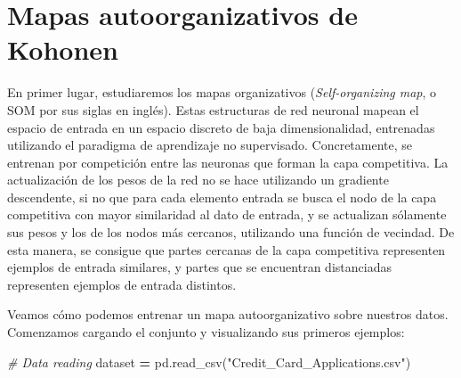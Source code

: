 \documentclass[
  a4paper,
,tablecaptionabove
]{scrartcl}
\newenvironment{Shaded}{\begin{snugshade}}{\end{snugshade}}
\newcommand{\CommentTok}[1]{\textcolor[rgb]{0.56,0.35,0.01}{\textit{#1}}}
\newcommand{\NormalTok}[1]{#1}
\newcommand{\OperatorTok}[1]{\textcolor[rgb]{0.81,0.36,0.00}{\textbf{#1}}}
\newcommand{\StringTok}[1]{\textcolor[rgb]{0.31,0.60,0.02}{#1}}
\begin{document}
\hypertarget{mapas-autoorganizativos-de-kohonen}{%
\section{Mapas autoorganizativos de
Kohonen}\label{mapas-autoorganizativos-de-kohonen}}

En primer lugar, estudiaremos los mapas organizativos
(\emph{Self-organizing map}, o SOM por sus siglas en inglés). Estas
estructuras de red neuronal mapean el espacio de entrada en un espacio
discreto de baja dimensionalidad, entrenadas utilizando el paradigma de
aprendizaje no supervisado. Concretamente, se entrenan por competición
entre las neuronas que forman la capa competitiva. La actualización de
los pesos de la red no se hace utilizando un gradiente descendente, si
no que para cada elemento entrada se busca el nodo de la capa
competitiva con mayor similaridad al dato de entrada, y se actualizan
sólamente sus pesos y los de los nodos más cercanos, utilizando una
función de vecindad. De esta manera, se consigue que partes cercanas de
la capa competitiva representen ejemplos de entrada similares, y partes
que se encuentran distanciadas representen ejemplos de entrada
distintos.

Veamos cómo podemos entrenar un mapa autoorganizativo sobre nuestros
datos. Comenzamos cargando el conjunto y visualizando sus primeros
ejemplos:

\begin{Shaded}
\begin{Highlighting}[]
\CommentTok{# Data reading}
\NormalTok{dataset }\OperatorTok{=}\NormalTok{ pd.read_csv(}\StringTok{"Credit_Card_Applications.csv"}\NormalTok{)}
\end{Highlighting}
\end{Shaded}

\begin{table}[H]
\centering
{}
\end{table}
\end{document}
